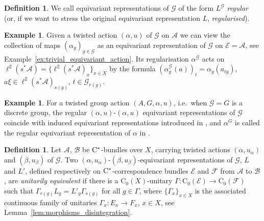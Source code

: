 \documentclass[11 pt, leqno]{amsart}
\numberwithin{equation}{section}
\theoremstyle{plain}
\theoremstyle{definition}
\newtheorem {defn}[thm] {Definition}
\newtheorem{ex}[thm]{Example}
\newcommand*{\contz}{\mathrm{C_0}}%
\newcommand{\B}{\mathcal B}
\newcommand{\G}{\mathcal G} %
\newcommand{\EE}{\mathcal E}
\newcommand{\FF}{\mathcal F}
\newcommand{\A}{\mathcal A}
\newcommand{\cst}{\ifmmode\mathrm{C}^*\else{$\mathrm{C}^*$}\fi}
\begin{document}
\begin{defn}\label{def:regular_reps} 
We call equivariant representations of $\G$ of the form $L^{\G}$ \emph{regular} (or, if we want to stress the original equivariant representation $L$, \emph{regularised}).
\end{defn}

\begin{ex}\label{ex:trivial_equivariant_action2} 
Given a twisted action $(\alpha,u)$ of $\G$ on $\A$ we can view the collection of maps $(\alpha_g)_{g \in \G}$ as an equivariant representation of $\G$ on $\EE=\A$, see Example~\ref{ex:trivial_equivariant_action}. 
Its regularisation $\alpha^{\G}$ acts on $\ell^2(s^*\A)=\{\ell^2(s^*\A)_x\}_{x\in X}$ by the formula $(\alpha^{\G}_{g}(a))_t = \alpha_g (a_{t g})$, $a \xi\in \ell^2(s^*\A)_{s(g)}$, $t \in \G_{r(g)}$. 
\end{ex}

\begin{ex}
For a twisted  group action $(A,G,\alpha, u)$, i.e.\ when $\G=G$ is a discrete group, the regular $(\alpha,u)$-$(\alpha,u)$ equivariant representations of $\G$ coincide with induced equivariant representations introduced in \cite[Example 4.8]{BedosContiregular}, and $\alpha^G$ is called the regular equivariant representation of $\alpha$ in \cite[Example 4.7]{BedosContiregular}.
\end{ex}

\begin{defn}
Let $\A$, $\B$ be $\cst$-bundles over $X$, carrying twisted actions $(\alpha,u_\alpha)$ and $(\beta,u_\beta)$ of $\G$.
Two $(\alpha,u_{\alpha})$-$(\beta,u_{\beta})$-equivariant representations of $\G$, $L$ and $L'$, defined respectively on $\cst$-correspondence bundles $\EE$ and $\FF$ from $\A$ to $\B$, are \emph{unitarily equivalent} if there is a $\contz(X)$-unitary  $\Gamma:\contz(\EE) \to \contz(\FF)$ such that $\Gamma_{r(g)} L_g = L'_g \Gamma_{s(g)}$ for all $g \in \Gamma$, where $\{\Gamma_x\}_{x \in X}$ is the associated continuous family of unitaries $\Gamma_x:E_x \to F_x$, $x\in X$, see Lemma~\ref{lem:morphisms_disintegration}.
\end{defn}
\end{document}
